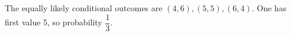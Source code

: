 The equally likely conditional outcomes are $(4,6),(5,5),(6,4)$. One has first value 5, so probability $\boxed{\dfrac{1}{3}}$.

